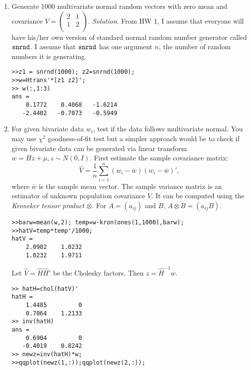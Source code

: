 \documentclass[11pt,twocolumn]{article} %
\begin{document}
\begin{enumerate}
\item Generate 1000 multivariate normal random vectors with zero
mean and covariance $V=\left(
\begin{array}{cc}
  2 & 1 \\
  1 & 2 \\
\end{array}
\right).$ {\em Solution.} From HW 1, I assume that everyone will
have his/her own version of standard normal random number
generator called $\tt{snrnd}$. I assume that $\tt{snrnd}$ has one
argument $n$, the number of random numbers it is generating.
\begin{verbatim}
>>z1 = snrnd(1000); z2=snrnd(1000); 
>>w=Htrans'*[z1 z2]';
>> w(:,1:3)
ans =
    0.1772    0.4068   -1.6214
   -2.4402   -0.7073   -0.5949
\end{verbatim}
\item For given bivariate data $w_i$, test if the data follows
multivariate normal. You may use $\chi^2$ goodness-of-fit test but
a simpler approach would be to check if given bivariate data can
be generated via linear transform $w=Hz +\mu, z \sim N(0, I)$.
First estimate the sample covariance matrix:
$$\hat V = \frac{1}{n}\sum_{i=1}^n (w_i - \bar w)(w_i -\bar w)',$$
where $\bar w$ is the sample mean vector. The sample variance
matrix is an estimator of unknown population covariance $V$. It
can be computed using the {\em Kroneker tensor product} $\otimes$.
For $A=(a_{ij})$ and $B$, $A \otimes B = (a_{ij}B)$.
\begin{verbatim}
>>barw=mean(w,2); temp=w-kron(ones(1,1000),barw);
>>hatV=temp*temp'/1000;
hatV =
    2.0982    1.0232
    1.0232    1.9711
\end{verbatim}
Let $\hat V = \hat H \hat H'$ be the Cholesky factors. Then $z =
\hat H^{-1}w$.
\begin{verbatim}
>> hatH=chol(hatV)'
hatH =
    1.4485         0
    0.7064    1.2133
>> inv(hatH)
ans =
    0.6904         0
   -0.4019    0.8242
>> newz=inv(hatH)*w;
>>qqplot(newz(1,:));qqplot(newz(2,:));
\end{verbatim}
\end{enumerate}
\end{document}
